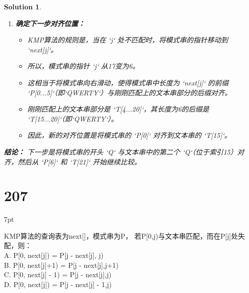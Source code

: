 \documentclass[UTF8]{report}
\newtheorem{solution}{Solution}
\theoremstyle{MyLineTheoremStyle} %
\theoremstyle{MyBlockTheoremStyle} %
\theoremstyle{MySubsubsectionStyle} %
\newenvironment{graybox}{%
        \def\FrameCommand{%
        \hspace{1pt}%
        {\color{gray}\small \vrule width 2pt}%
        {\color{graybox_color}\vrule width 4pt}%
        \colorbox{graybox_color}%
        }%
        \MakeFramed{\advance\hsize-\width\FrameRestore}%
        \noindent\hspace{-4.55pt}%
        \begin{adjustwidth}{}{7pt}%
        \vspace{2pt}\vspace{2pt}%
        }
        {%
        \vspace{2pt}\end{adjustwidth}\endMakeFramed%
        }
\begin{document}
\begin{solution}
\begin{enumerate}
    \item \textbf{确定下一步对齐位置：}
    \begin{itemize}
        \item KMP算法的规则是，当在 `j` 处不匹配时，将模式串的指针移动到 `next[j]`。
        \item 所以，模式串的指针 `j` 从17变为6。
        \item 这相当于将模式串向右滑动，使得模式串中长度为 `next[j]` 的前缀 `P[0...5]`（即`QWERTY`）与刚刚匹配上的文本串部分的后缀对齐。
        \item 刚刚匹配上的文本串部分是 `T[4...20]`，其长度为6的后缀是 `T[15...20]`（即`QWERTY`）。
        \item 因此，新的对齐位置是将模式串的 `P[0]` 对齐到文本串的 `T[15]`。
    \end{itemize}
\end{enumerate}

\textbf{结论：}
下一步是将模式串的开头 `Q` 与文本串中的第二个 `Q`（位于索引15）对齐，然后从 `P[6]` 和 `T[21]` 开始继续比较。
\end{solution}


\section*{207}
\begin{graybox}
KMP算法的查询表为next[]，模式串为P，
若P[0,j)与文本串匹配，而在P[j]处失配，则：\\
A. P[0, next[j]) = P[j - next[j], j)\\
B. P[0, next[j]+1) = P[j - next[j],j+1)\\
C. P[0, next[j] - 1) = P[j - next[j],j)\\
D. P[0, next[j]) = P[j - next[j] - 1,j)
\end{graybox}
\end{document}
